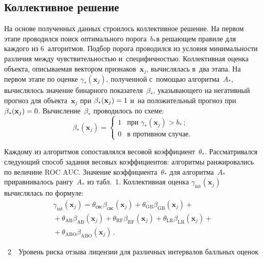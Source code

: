 \begin{multicols}{2}
\section{Коллективное решение }

      На основе полученных данных строилось коллективное решение. На 
первом этапе проводился поиск оптимального порога~$b_*$в решающем 
правиле для каждого из 6~алгоритмов. Подбор порога проводился из условия 
минимальности различия между чувствительностью и~специфичностью. 
Коллективная оценка объекта, описываемая вектором 
признаков~$\mathbf{x}_j$, вычислялась в~два этапа. На первом этапе по 
оценке $\gamma_*(\mathbf{x}_j)$, полученной с~помощью алгоритма~$A_*$, 
вычислялось значение бинарного показателя~$\beta_*$, указывающего на 
негативный прогноз для объекта~$\mathbf{x}_j$ при 
$\beta_*(\mathbf{x}_j)\hm=1$ и~на положительный прогноз при 
$\beta_*(\mathbf{x}_j)\hm=0$. Вычисление~$\beta_*$ проводилось по схеме: 
$$
\beta_*(\mathbf{x}_j)=
\begin{cases}
1 & \mbox{при } \gamma_*(\mathbf{x}_j)>b_*\,;\\
0 & \mbox{в~противном~случае}.
\end{cases}
$$

 Каждому из алгоритмов 
сопоставлялся весовой коэффициент~$\theta_*$. Рассматривался следующий 
способ задания весовых коэффициентов: алгоритмы ранжировались по 
величине ROC AUC. Значение коэффициента~$\theta_*$ для 
алгоритма~$A_*$ приравнивалось рангу~$A_*$ из табл.~1. Коллективная 
оценка $\gamma_{\mathrm{int}}(\mathbf{x}_j)$ вычислялась по формуле:
      \begin{multline*}
      \gamma_{\mathrm{int}}(\mathbf{x}_j) =
      \theta_{\mathrm{свс}} \beta_{\mathrm{свс}} 
(\mathbf{x}_j) +\theta_{\mathrm{GB}}\beta_{\mathrm{GB}}(\mathbf{x}_j) +{}\\
{}+\theta_{\mathrm{AB}}  \beta_{\mathrm{AB}} (\mathbf{x}_j) +
\theta_{\mathrm{RF}}  \beta_{\mathrm{RF}} (\mathbf{x}_j) +
\theta_{\mathrm{LR}}\beta_{\mathrm{LR}}(\mathbf{x}_j)+{}\\
{}+
\theta_{\mathrm{ABO}}\beta_{\mathrm{ABO}}  (\mathbf{x}_j)\,.
      \end{multline*}
      
{%
\begin{center}

\parbox{70mm}{{{\tablename~2}\ \ \small{Уровень риска отзыва лицензии для различных интервалов балльных оценок}}

}
\end{center}}
\end{multicols}
